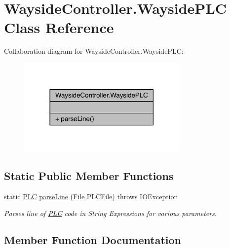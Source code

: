 \hypertarget{classWaysideController_1_1WaysidePLC}{}\section{Wayside\+Controller.\+Wayside\+P\+LC Class Reference}
\label{classWaysideController_1_1WaysidePLC}


Collaboration diagram for Wayside\+Controller.\+Wayside\+P\+LC\+:
\nopagebreak
\begin{figure}[H]
\begin{center}
\leavevmode
\includegraphics[width=237pt]{classWaysideController_1_1WaysidePLC__coll__graph}
\end{center}
\end{figure}
\subsection*{Static Public Member Functions}
\begin{DoxyCompactItemize}
\item 
static \hyperlink{classWaysideController_1_1PLC}{P\+LC} \hyperlink{classWaysideController_1_1WaysidePLC_ad86ef8fd5cc1469ad74dfee0be89b499}{parse\+Line} (File P\+L\+C\+File)  throws I\+O\+Exception
\begin{DoxyCompactList}\small\item\em Parses line of \hyperlink{classWaysideController_1_1PLC}{P\+LC} code in String Expressions for various parameters. \end{DoxyCompactList}\end{DoxyCompactItemize}


\subsection{Member Function Documentation}
\mbox{\label{classWaysideController_1_1WaysidePLC_ad86ef8fd5cc1469ad74dfee0be89b499}} 
